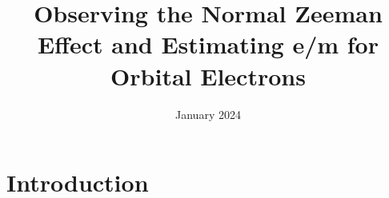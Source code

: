 \documentclass{article}
\title{Observing the Normal Zeeman Effect and Estimating e/m for Orbital Electrons}
\date{January 2024}
\begin{document}
\maketitle

\section{Introduction}
\end{document}
